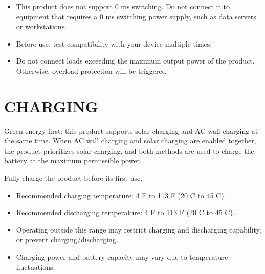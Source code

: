 \documentclass[a4paper,10pt,twoside,openany,english]{sphinxhowto}
\let\sphinxpxdimen\pdfpxdimen\else\newdimen\sphinxpxdimen
\begin{document}
\noindent\sphinxincludegraphics[width=360\sphinxpxdimen]{{fig}.png}

\sphinxAtStartPar
{}
\begin{itemize}
\item {} 
\sphinxAtStartPar
This product does not support 0 ms switching. Do not connect it to equipment that requires a 0 ms switching power supply, such as data servers or workstations.

\item {} 
\sphinxAtStartPar
Before use, test compatibility with your device multiple times.

\item {} 
\sphinxAtStartPar
Do not connect loads exceeding the maximum output power of the product. Otherwise, overload protection will be triggered.

\end{itemize}



\section{CHARGING}
\label{\detokenize{index:charging}}
\sphinxAtStartPar
Green energy first: this product supports solar charging and AC wall charging at the same time.
When AC wall charging and solar charging are enabled together, the product prioritizes solar charging,
and both methods are used to charge the battery at the maximum permissible power.

\sphinxAtStartPar
Fully charge the product before its first use.

\sphinxAtStartPar
{}
\begin{itemize}
\item {} 
\sphinxAtStartPar
Recommended charging temperature: \sphinxhyphen{}4 F to 113 F (\sphinxhyphen{}20 C to 45 C).

\item {} 
\sphinxAtStartPar
Recommended discharging temperature: \sphinxhyphen{}4 F to 113 F (\sphinxhyphen{}20 C to 45 C).

\item {} 
\sphinxAtStartPar
Operating outside this range may restrict charging and discharging capability, or prevent charging/discharging.

\item {} 
\sphinxAtStartPar
Charging power and battery capacity may vary due to temperature fluctuations.

\end{itemize}
\end{document}
